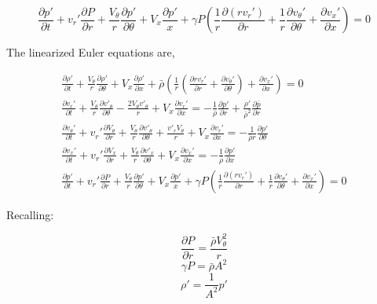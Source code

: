 \documentclass[12pt]{article}
\begin{document}
\begin{equation*}
\boxed{\frac{\partial p '}{\partial t} + v_r'\frac{\partial P}{\partial r} + \frac{V_{\theta}}{r}\frac{\partial p'}{\partial \theta} + V_x\frac{\partial p'}{x} + \gamma P \left(\frac{1}{r}\frac{\partial (r v_r')}{\partial r} + \frac{1}{r} \frac{\partial v_{\theta}'}{\partial \theta} + \frac{\partial v_x'}{\partial x}\right) = 0}
\end{equation*}
\newpage

The linearized Euler equations are,

\begin{align*}
\frac{\partial \rho'}{\partial t} +
\frac{V_{\theta}}{r}
\frac{\partial \rho'}{\partial \theta} + 
V_x
\frac{\partial \rho'}{\partial x} +
\bar{\rho}
\left(
\frac{1}{r}
\left(
\frac{\partial r v_r'}{\partial r} + \frac{\partial v_{\theta}'}{\partial \theta}		 
\right) +
\frac{\partial v_x'}{\partial x}
\right)= 0\\
\frac{\partial  v_r' }{\partial t} +
\frac{V_{\theta}}{r} \frac{\partial v'_{\theta}}{\partial \theta} -
\frac{2V_{\theta}v'_{\theta}}{r} +
V_x \frac{\partial v_r'}{\partial x} = -\frac{1    }{\bar{\rho}}  \frac{\partial p'}{\partial r} +
\frac{\rho'}{\bar{\rho}^2}\frac{\partial \bar{p}}{\partial r}\\
\frac{\partial  v_{\theta}' }{\partial t} +
v_r' \frac{\partial  V_{\theta}  }{\partial r} +
\frac{V_{\theta}}{r} \frac{\partial v'_{\theta}}{\partial \theta} +
\frac{v'_rV_{\theta}}{r} +
V_x \frac{\partial v_r'}{\partial x} 
= -\frac{1}{\bar{\rho} r}	\frac{\partial p'}{\partial \theta}\\
\frac{\partial  v_x' }{\partial t} +
v_r' \frac{\partial  V_x  }{\partial r} +
\frac{V_{\theta}}{r} \frac{\partial v'_x}{\partial \theta} +
V_x \frac{\partial v_x'}{\partial x} 
= -\frac{1    }{\bar{\rho}}  \frac{\partial p'}{\partial x} \\
\frac{\partial p '}{\partial t} +
v_r'\frac{\partial P}{\partial r} + 
\frac{V_{\theta}}{r}\frac{\partial p'}{\partial \theta} + 
V_x\frac{\partial p'}{x} + 
\gamma P \left(\frac{1}{r}\frac{\partial (r v_r')}{\partial r} + 
\frac{1}{r} \frac{\partial v_{\theta}'}{\partial \theta} + \frac{\partial v_x'}{\partial x}\right) = 0
\end{align*}


Recalling:

\[\frac{\partial P}{\partial r} = \frac{\bar{\rho} V_{\theta}^2}{r} \]
\[\gamma P  = \bar{\rho}A^2\]
\[\rho' = \frac{1}{A^2} p'\]
\end{document}
